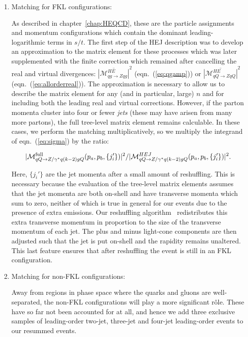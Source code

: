 	\begin{enumerate}
		\item Matching for FKL configurations:

		  As described in chapter~\ref{chap:HEQCD}, these are the particle assignments
		  and momentum configurations which contain the dominant leading-logarithmic
		  terms in $s/t$.  The first step of the HEJ description was to develop an
		  approximation to the matrix element for these processes which was later
		  supplemented with the finite correction which remained after cancelling the
		  real and virtual divergences: $\overline{|\mathcal{M}_{qg\to Zqg}^{HE}|}^2$
		  (eqn.~(\ref{eq:qgamp})) or $\overline{|\mathcal{M}_{qQ\to ZqQ}^{HE}|}^2$
		  (eqn.~(\ref{eq:allorderreal})).  The approximation is necessary to allow us to
		  describe the matrix element for any (and in particular, large) $n$ and for
		  including both the leading real and virtual corrections.  However,
		  if the parton momenta cluster into four or fewer \emph{jets} (these
		  may have arisen from many more partons), the full tree-level matrix element remains
		  calculable.  In these cases, we perform the matching multiplicatively, so we
		  multiply the integrand of eqn.~(\ref{eq:sigma}) by the ratio:

		  \begin{align}
		    |\mathcal{M}^{\rm full}_{qQ\to Z/\gamma^* q(k-2)gQ}(p_a,p_b,\{
		    j_i'\})|^2/|\mathcal{M}^{HEJ}_{qQ\to Z/\gamma^* q(k-2)gQ}(p_a,p_b,\{j_i'\})|^2.
		  \end{align}

		  Here, $\{j_i'\}$ are the jet momenta after a small amount of
		  reshuffling.  This is necessary because the evaluation of the tree-level matrix elements
		  assumes that the jet momenta are both on-shell and have transverse momenta which
		  sum to zero, neither of which is true in general for our events due to the
		  presence of extra emissions.  Our reshuffling algorithm~\cite{Andersen:2011hs} redistributes this
		  extra transverse momentum in proportion to the size of the transverse
		  momentum of each jet.  The plus and minus light-cone components are then adjusted such
		  that the jet is put on-shell and the rapidity remains unaltered.  This last
		  feature ensures that after reshuffling the event is still in an FKL
		  configuration.

		\item Matching for non-FKL configurations:

		  Away from regions in phase space where the quarks and gluons are
		  well-separated, the non-FKL configurations will play a more significant
		  r\^ole.  These have so far not been accounted for at all, and hence we add
		  three exclusive samples of leading-order two-jet, three-jet and four-jet
		  leading-order events to our resummed events.
	\end{enumerate}

